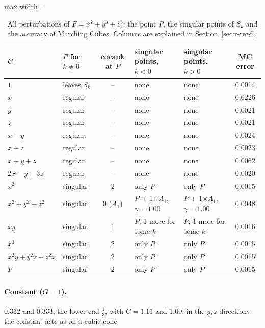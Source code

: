\documentclass[12pt, a4paper]{article}
\theoremstyle{plain}
\theoremstyle{definition}
\theoremstyle{remark}
\theoremstyle{definition}
\begin{document}
\begin{table}[!h]
\centering
\footnotesize
\begin{adjustbox}{max width=\textwidth}
\begin{tabular}{l l c l l c}
\toprule
$G$ & $P$ for $k\neq0$ & corank at $P$ & singular points, $k<0$ & singular points, $k>0$ & MC error \\
\midrule
$1$ & leaves $S_k$ & -- & none & none & 0.0014 \\
$x$ & regular & -- & none & none & 0.0226 \\
$y$ & regular & -- & none & none & 0.0021 \\
$z$ & regular & -- & none & none & 0.0021 \\
$x+y$ & regular & -- & none & none & 0.0024 \\
$x+z$ & regular & -- & none & none & 0.0023 \\
$x+y+z$ & regular & -- & none & none & 0.0062 \\
$2x-y+3z$ & regular & -- & none & none & 0.0020 \\
$x^2$ & singular & 2 & only $P$ & only $P$ & 0.0015 \\
$x^2+y^2-z^2$ & singular & 0 ($A_1$) & $P$ + 1$\times$$A_1$, $\gamma=1.00$ & $P$ + 1$\times$$A_1$, $\gamma=1.00$ & 0.0048 \\
$xy$ & singular & 1 & $P$; 1 more for some $k$ & $P$; 1 more for some $k$ & 0.0016 \\
$x^3$ & singular & 2 & only $P$ & only $P$ & 0.0015 \\
$x^2y+y^2z+z^2x$ & singular & 2 & only $P$ & only $P$ & 0.0015 \\
$F$ & singular & 2 & only $P$ & only $P$ & 0.0015 \\
\bottomrule
\end{tabular}
\end{adjustbox}
\caption[Singular points for $x^2+y^3+z^3$]{All perturbations of $F=x^2+y^3+z^3$: the point $P$, the singular points of $S_k$ and the accuracy of Marching Cubes. Columns are explained in Section~\ref{sec:r-read}.}
\label{tab:r-D4a-points}
\end{table}
\paragraph{Constant ($G=1$).} $0.332$ and $0.333$, the lower end $\tfrac13$, with
$C=1.11$ and $1.00$: in the $y,z$ directions the constant acts as on a cubic cone.
\end{document}
